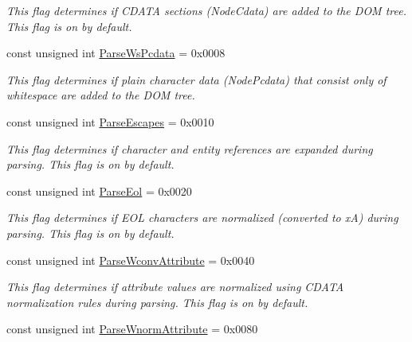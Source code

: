 \begin{DoxyCompactItemize}
\begin{DoxyCompactList}\small\item\em This flag determines if CDATA sections (NodeCdata) are added to the DOM tree. This flag is on by default. \item\end{DoxyCompactList}\item 
const unsigned int \hyperlink{namespacephys_1_1xml_a48c0da99d1ed62b1a4984293e64828c6}{ParseWsPcdata} = 0x0008
\begin{DoxyCompactList}\small\item\em This flag determines if plain character data (NodePcdata) that consist only of whitespace are added to the DOM tree. \item\end{DoxyCompactList}\item 
\hypertarget{namespacephys_1_1xml_a6463412ba9e404b6890e4721255cd8ed}{
const unsigned int \hyperlink{namespacephys_1_1xml_a6463412ba9e404b6890e4721255cd8ed}{ParseEscapes} = 0x0010}
\label{d9/d27/namespacephys_1_1xml_a6463412ba9e404b6890e4721255cd8ed}

\begin{DoxyCompactList}\small\item\em This flag determines if character and entity references are expanded during parsing. This flag is on by default. \item\end{DoxyCompactList}\item 
\hypertarget{namespacephys_1_1xml_a52af747730d2b3a313eebed4cf49a333}{
const unsigned int \hyperlink{namespacephys_1_1xml_a52af747730d2b3a313eebed4cf49a333}{ParseEol} = 0x0020}
\label{d9/d27/namespacephys_1_1xml_a52af747730d2b3a313eebed4cf49a333}

\begin{DoxyCompactList}\small\item\em This flag determines if EOL characters are normalized (converted to xA) during parsing. This flag is on by default. \item\end{DoxyCompactList}\item 
\hypertarget{namespacephys_1_1xml_af9f7575e3cb8a0d8ad9a7ceee5e26983}{
const unsigned int \hyperlink{namespacephys_1_1xml_af9f7575e3cb8a0d8ad9a7ceee5e26983}{ParseWconvAttribute} = 0x0040}
\label{d9/d27/namespacephys_1_1xml_af9f7575e3cb8a0d8ad9a7ceee5e26983}

\begin{DoxyCompactList}\small\item\em This flag determines if attribute values are normalized using CDATA normalization rules during parsing. This flag is on by default. \item\end{DoxyCompactList}\item 
\hypertarget{namespacephys_1_1xml_acddcc88320f06c933c67cdd77704c838}{
const unsigned int \hyperlink{namespacephys_1_1xml_acddcc88320f06c933c67cdd77704c838}{ParseWnormAttribute} = 0x0080}
\label{d9/d27/namespacephys_1_1xml_acddcc88320f06c933c67cdd77704c838}


\end{DoxyCompactItemize}
